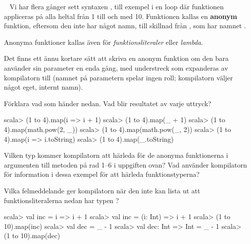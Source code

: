 \QUESTEND









\QUESTBEGIN

\Task  \what~  Vi har flera gånger sett syntaxen , till exempel i en loop  där funktionen  appliceras på alla heltal från 1 till och med 10. Funktionen  kallas en \textbf{anonym} funktion, eftersom den inte har något namn, till skillnad från , som har namnet .

Anonyma funktioner kallas även för \emph{funktionsliteraler} eller \emph{lambda}.

Det finns ett ännu kortare sätt att skriva en anonym funktion om den bara använder sin parameter en enda gång, med understreck  som expanderas av kompilatorn till  (namnet på parametern spelar ingen roll; kompilatorn väljer något eget, internt namn).

\Subtask Förklara vad som händer nedan. Vad blir resultatet av varje uttryck?

\begin{REPL}
scala> (1 to 4).map(i => i + 1)
scala> (1 to 4).map(_ + 1)
scala> (1 to 4).map(math.pow(2, _))
scala> (1 to 4).map(math.pow(_, 2))
scala> (1 to 4).map(i => i.toString)
scala> (1 to 4).map(_.toString)
\end{REPL}

\Subtask Vilken typ kommer kompilatorn att härleda för de anonyma funktionerna i argumenten till metoden  på rad 1--6 i uppgiften ovan? Vad använder kompilatorn för information i dessa exempel för att härleda funktionstyperna?

\Subtask Vilka felmeddelande ger kompilatorn när den inte kan lista ut att funktionsliteralerna nedan har typen ?

\begin{REPL}
scala> val inc = i => i + 1
scala> val inc = (i: Int) => i + 1
scala> (1 to 10).map(inc)
scala> val dec = _ - 1
scala> val dec: Int => Int = _ - 1
scala> (1 to 10).map(dec)
\end{REPL}



\SOLUTION


\TaskSolved \what


